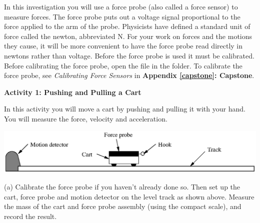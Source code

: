 In this investigation you will use a force probe (also called a force sensor) to measure forces. The force probe puts out a voltage signal proportional to the force applied to the arm of the probe. Physicists have defined a standard unit of force called the newton, abbreviated N. For your work on forces and the motions they cause, it will be more convenient to have the force probe read directly in newtons rather than voltage. Before the force probe is used it must be calibrated. Before calibrating the force probe, open the 
 file in the \filename{\coursefolder} folder.
To calibrate the force probe, see \textit{Calibrating Force Sensors} in \textbf{Appendix \ref{capstone}: Capstone}.

%

\textbf{Activity 1: Pushing and Pulling a Cart} 

In this activity you will move a cart by pushing and pulling it with your hand.
You will measure the force, velocity and acceleration. 

\vspace{-0.2cm}
{\par\centering \includegraphics{force1/force1_fig1.eps} \par}

(a) Calibrate the force probe if you haven't already done so. Then set up the cart, force probe and motion detector on the level track as shown above. Measure the mass of the cart and force probe assembly (using the compact scale), and record the result.



